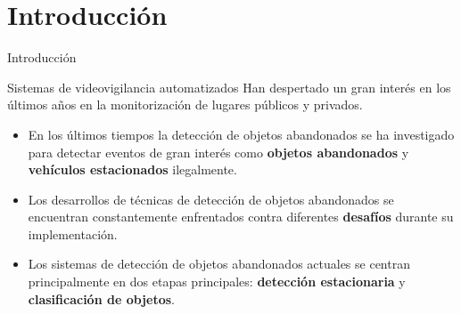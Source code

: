 \section{Introducción}

\begin{frame}{Introducción}

\begin{block}{Sistemas de videovigilancia automatizados}
\justifying
Han despertado un gran interés en los últimos años en la monitorización de lugares públicos y privados.
\vspace{0.2cm}
\end{block}

\begin{itemize}
    \justifying
    \item En los últimos tiempos la detección de objetos abandonados se ha investigado para detectar eventos de gran interés como \textbf{objetos abandonados} y \textbf{vehículos estacionados} ilegalmente.
    \item Los desarrollos de técnicas de detección de objetos abandonados se encuentran constantemente enfrentados contra diferentes \textbf{desafíos} durante su implementación.
    \item Los sistemas de detección de objetos abandonados actuales se centran principalmente en dos etapas principales: \textbf{detección estacionaria} y \textbf{clasificación de objetos}.
\end{itemize}

\end{frame}


